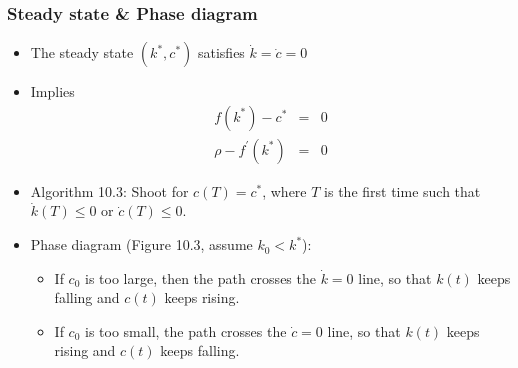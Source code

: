 \documentclass[bigger,handout]{beamer}
\newenvironment{stepitemize}{\begin{itemize}[<+->]}{\end{itemize} }
\begin{document}
\begin{frame}%
 
\frametitle{Steady state \& Phase diagram}

\begin{stepitemize}
\item The steady state $(k^{\ast },c^{\ast })$ satisfies $\dot{k}=\dot{c}=0$

\item Implies%
\begin{eqnarray*}
f(k^{\ast })-c^{\ast } &=&0 \\
\rho -f^{\prime }(k^{\ast }) &=&0
\end{eqnarray*}

\item Algorithm 10.3: Shoot for $c(T)=c^{\ast }$, where $T$ is the first
time such that $\dot{k}(T)\leq 0$ or $\dot{c}(T)\leq 0$.

\item Phase diagram (Figure 10.3, assume $k_{0}<k^{\ast }$):

\begin{itemize}
\item If $c_{0}$ is too large, then the path crosses the $\dot{k}=0$ line, 
\newline
so that $k(t)$ keeps falling and $c(t)$ keeps rising.

\item If $c_{0}$ is too small, the path crosses the $\dot{c}=0$ line, 
\newline
so that $k(t)$ keeps rising and $c(t)$ keeps falling.
\end{itemize}
\end{stepitemize}

 
 
\end{frame}%
 
 
 
\end{document}
